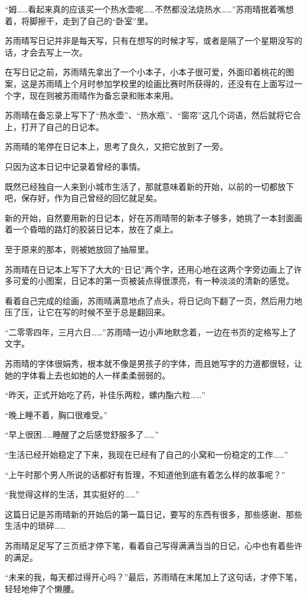 “姆……看起来真的应该买一个热水壶呢……不然都没法烧热水……”苏雨晴抿着嘴想着，将脚擦干，走到了自己的“卧室”里。

苏雨晴写日记并非是每天写，只有在想写的时候才写，或者是隔了一个星期没写的话，才会去写上一次。

在写日记之前，苏雨晴先拿出了一个小本子，小本子很可爱，外面印着桃花的图案，这是苏雨晴上个月时参加学校里的绘画比赛时所获得的，还没有在上面写过一个字，现在则被苏雨晴作为备忘录和账本来用。

苏雨晴在备忘录上写下了“热水壶”、“热水瓶”、“窗帘”这几个词语，然后就将它合上，打开了自己的日记本。

苏雨晴的笔停在日记本上，思考了良久，又把它放到了一旁。

只因为这本日记中记录着曾经的事情。

既然已经独自一人来到小城市生活了，那就意味着新的开始，以前的一切都放下吧，保存好，作为自己曾经的回忆就足矣。

新的开始，自然要用新的日记本，好在苏雨晴带的新本子够多，她挑了一本封面画着一个昏暗的路灯的胶装日记本，放在了桌上。

至于原来的那本，则被她放回了抽屉里。

苏雨晴在日记本上写下了大大的“日记”两个字，还用心地在这两个字旁边画上了许多可爱的小图案，日记本的第一页被装点得很漂亮，有一种淡淡的清新的感觉。

看着自己完成的绘画，苏雨晴满意地点了点头，将日记向下翻了一页，然后用力地压了压，让它在写的时候不至于总是翻回来。

“二零零四年，三月六日……”苏雨晴一边小声地默念着，一边在书页的定格写上了文字。

苏雨晴的字体很娟秀，根本就不像是男孩子的字体，而且她写字的力道都很轻，让她的字体看上去也如她的人一样柔柔弱弱的。

“昨天，正式开始吃了药，补佳乐两粒，螺内酯六粒……”

“晚上睡不着，胸口很难受。”

“早上很困……睡醒了之后感觉舒服多了……”

“生活已经开始稳定了下来，我现在已经有了自己的小窝和一份稳定的工作……”

“上午时那个男人所说的话都好有哲理，不知道他到底有着怎么样的故事呢？”

“我觉得这样的生活，其实挺好的……”

这篇日记是苏雨晴新的开始后的第一篇日记，要写的东西有很多，那些感谢、那些生活中的琐碎……

苏雨晴足足写了三页纸才停下笔，看着自己写得满满当当的日记，心中也有着些许的满足。

“未来的我，每天都过得开心吗？”最后，苏雨晴在末尾加上了这句话，才停下笔，轻轻地伸了个懒腰。

